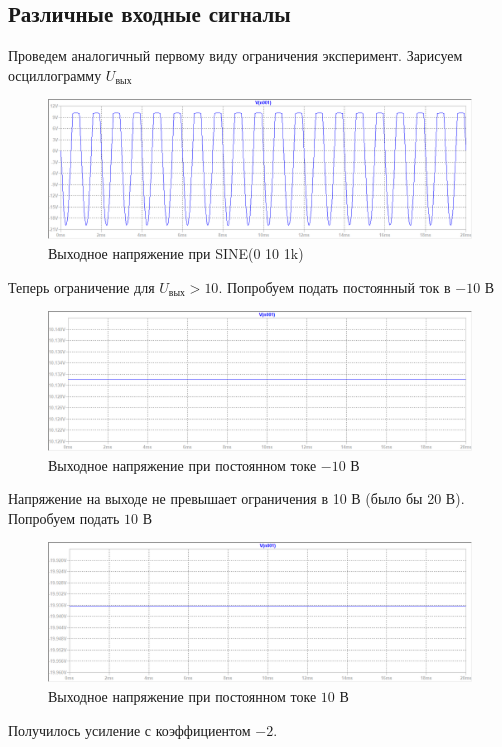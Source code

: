 \documentclass[a4paper, 12pt]{article}
\begin{document}
    \subsection{Различные входные сигналы}
    Проведем аналогичный первому виду ограничения эксперимент.
    Зарисуем осциллограмму $U_\text{вых}$
    \begin{figure}[H]
        \centering
        \includegraphics[scale=0.46]{1task2_sine_a10_f1k.png}
        \captionsetup{skip=0pt}
        \caption{Выходное напряжение при SINE(0 10 1k)}
        \label{fig:1task2_sine_a10_f1k}
    \end{figure}
    \noindent Теперь ограничение для $U_\text{вых}>10$. Попробуем подать постоянный ток в $-10$ В
    \begin{figure}[H]
        \centering
        \includegraphics[scale=0.46]{1task2_const_m10.png}
        \captionsetup{skip=0pt}
        \caption{Выходное напряжение при постоянном токе $-10$ В}
        \label{fig:1task2_const_m5}
    \end{figure}
    \noindent Напряжение на выходе не превышает ограничения в 10 В (было бы 20 В). Попробуем подать $10$ В
    \begin{figure}[H]
        \centering
        \includegraphics[scale=0.46]{1task2_const_10.png}
        \captionsetup{skip=0pt}
        \caption{Выходное напряжение при постоянном токе $10$ В}
        \label{fig:1task2_const_5}
    \end{figure}
    \noindent Получилось усиление с коэффициентом $-2$.
\end{document}
